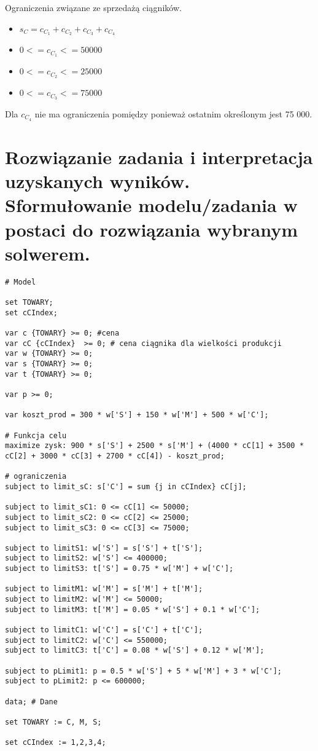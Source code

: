 \documentclass{article}
\begin{document}
Ograniczenia związane ze sprzedażą ciągników.

\begin{itemize}
  \item $s_C = c_C_1 + c_C_2 + c_C_3 + c_C_4$
  \item $0 <= c_C_1 <= 50 000$
  \item $0 <= c_C_2 <= 25 000$
  \item $0 <= c_C_3 <= 75 000$
\end{itemize}

Dla $c_C_4$ nie ma ograniczenia pomiędzy ponieważ ostatnim określonym jest 75 000.


\section{Rozwiązanie zadania i interpretacja uzyskanych wyników. Sformułowanie modelu/zadania w  postaci  do  rozwiązania  wybranym  solwerem. }

\lstset{language=AMPL}
\begin{lstlisting}[caption={Model napisany w języku AMPL},label=DescriptiveLabel]
# Model

set TOWARY;
set cCIndex;

var c {TOWARY} >= 0; #cena
var cC {cCIndex}  >= 0; # cena ciągnika dla wielkości produkcji
var w {TOWARY} >= 0;
var s {TOWARY} >= 0;
var t {TOWARY} >= 0;

var p >= 0;

var koszt_prod = 300 * w['S'] + 150 * w['M'] + 500 * w['C'];

# Funkcja celu
maximize zysk: 900 * s['S'] + 2500 * s['M'] + (4000 * cC[1] + 3500 * cC[2] + 3000 * cC[3] + 2700 * cC[4]) - koszt_prod;

# ograniczenia
subject to limit_sC: s['C'] = sum {j in cCIndex} cC[j];

subject to limit_sC1: 0 <= cC[1] <= 50000;
subject to limit_sC2: 0 <= cC[2] <= 25000;
subject to limit_sC3: 0 <= cC[3] <= 75000;

subject to limitS1: w['S'] = s['S'] + t['S'];
subject to limitS2: w['S'] <= 400000;
subject to limitS3: t['S'] = 0.75 * w['M'] + w['C'];

subject to limitM1: w['M'] = s['M'] + t['M'];
subject to limitM2: w['M'] <= 50000;
subject to limitM3: t['M'] = 0.05 * w['S'] + 0.1 * w['C'];

subject to limitC1: w['C'] = s['C'] + t['C'];
subject to limitC2: w['C'] <= 550000;
subject to limitC3: t['C'] = 0.08 * w['S'] + 0.12 * w['M'];

subject to pLimit1: p = 0.5 * w['S'] + 5 * w['M'] + 3 * w['C'];
subject to pLimit2: p <= 600000;

data; # Dane

set TOWARY := C, M, S;

set cCIndex := 1,2,3,4;
\end{lstlisting}
\end{document}
